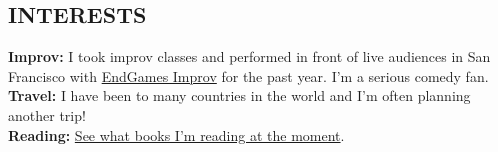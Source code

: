 \documentclass[margin, 10pt]{res}
\begin{document}
\begin{resume}
\begin{flushleft}

\section{INTERESTS}
{\bf Improv:} I took improv classes and performed in front of live audiences in San Francisco with \href{http://endgamesimprov.com/}{EndGames Improv} for the past year. I'm a serious comedy fan. \\
{\bf Travel:} I have been to many countries in the world and I'm often planning another trip! \\
{\bf Reading:} \href{http://www.goodreads.com/user/show/55900995-sean-mcqueen}{See what books I'm reading at the moment}. \\

\end{flushleft}

\end{resume}
\end{document}
